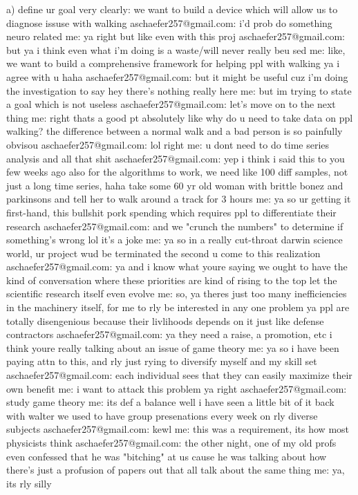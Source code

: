a) define ur goal very clearly: we want to build a device which will allow us to diagnose issuse with walking
 aschaefer257@gmail.com:  i'd prob do something neuro related
 me:  ya right
but like even with this proj
 aschaefer257@gmail.com:  but ya i think even what i'm doing is a waste/will never really beu sed
 me:  like, we want to build a comprehensive framework for helping ppl with walking
ya i agree with u haha
 aschaefer257@gmail.com:  but it might be useful cuz i'm doing the investigation to say hey there's nothing really here
 me:  but im trying to state a goal which is not useless
 aschaefer257@gmail.com:  let's move on to the next thing
 me:  right thats a good pt
absolutely
like why do u need to take data on ppl walking?
the difference between a normal walk and a bad person is so painfully obvisou
 aschaefer257@gmail.com:  lol right
 me:  u dont need to do time series analysis and all that shit
 aschaefer257@gmail.com:  yep i think i said this to you few weeks ago
also for the algorithms to work, we need like 100 diff samples, not just a long time series, haha
take some 60 yr old woman with brittle bonez and parkinsons and tell her to walk around a track for 3 hours
 me:  ya so ur getting it first-hand, this bullshit pork spending which requires ppl to differentiate their research
 aschaefer257@gmail.com:  and we "crunch the numbers" to determine if something's wrong
lol it's a joke
 me:  ya so in a really cut-throat darwin science world, ur project wud be terminated the second u come to this realization
 aschaefer257@gmail.com:  ya
and i know what youre saying
we ought to have the kind of conversation where these priorities are kind of rising to the top
let the scientific research itself even evolve
 me:  so, ya theres just too many inefficiencies in the machinery itself, for me to rly be interested in any one problem
ya ppl are totally disengenious
because their livlihoods depends on it
just like defense contractors
 aschaefer257@gmail.com:  ya
they need a raise, a promotion, etc
i think youre really talking about an issue of game theory
 me:  ya so i have been paying attn to this, and rly just rying to diversify myself and my skill set
 aschaefer257@gmail.com:  each individual sees that they can easily maximize their own benefit
 me:  i want to attack this problem
ya right
 aschaefer257@gmail.com:  study game theory
 me:  its def a balance
well i have seen a little bit of it
back with walter
we used to have group presenations every week on rly diverse subjects
 aschaefer257@gmail.com:  kewl
 me:  this was a requirement, its how most physicists think
 aschaefer257@gmail.com:  the other night, one of my old profs even confessed that he was "bitching" at us
cause he was talking about how there's just a profusion of papers out
that all talk about the same thing
 me:  ya, its rly silly

